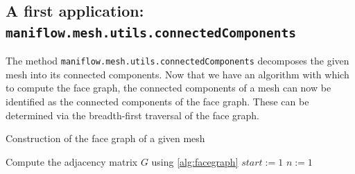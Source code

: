 \subsection{A first application: \texttt{maniflow.mesh.utils.connectedComponents}}\label{subsec:connected_Components}
The method \texttt{maniflow.mesh.utils.connectedComponents} decomposes the given mesh into its connected components. Now that we have an algorithm with which to compute the face graph, the connected components of a mesh can now be identified as the connected components of the face graph. These can be determined via the breadth-first traversal of the face graph. 
\begin{algorithm}

    \caption{Construction of the face graph of a given mesh}
    \label{alg:components}
    Compute the adjacency matrix $G$ using \ref{alg:facegraph}\;
    $start := 1$\;
    $n := 1$\;
    
\end{algorithm}
